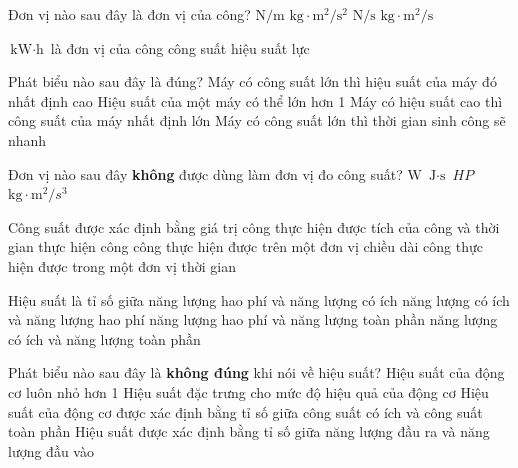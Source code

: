\begin{ex}
	Đơn vị nào sau đây là đơn vị của công?
	\choice
	{$\si{\newton/\meter}$}
	{\True $\si{\kilogram\cdot \meter^2/\second^2}$}
	{$\si{\newton/\second}$}
	{$\si{\kilogram\cdot\meter^2/\second}$}
	\loigiai{}
\end{ex}
\begin{ex}
	$\si{\kilo\watt\cdot\hour}$ là đơn vị của
	\choice
	{\True công}
	{công suất}
	{hiệu suất}
	{lực}
	\loigiai{}
\end{ex}
\begin{ex}
	Phát biểu nào sau đây là đúng?
	\choice
	{Máy có công suất lớn thì hiệu suất của máy đó nhất định cao}
	{Hiệu suất của một máy có thể lớn hơn 1}
	{Máy có hiệu suất cao thì công suất của máy nhất định lớn}
	{\True Máy có công suất lớn thì thời gian sinh công sẽ nhanh}
\end{ex}
\begin{ex}
	Đơn vị nào sau đây \textbf{không} được dùng làm đơn vị đo công suất?
	\choice
	{$\si{\watt}$}
	{\True $\si{\joule\cdot\second}$}
	{$\si{HP}$}
	{$\si{\kilogram\cdot\meter^2/s^3}$}
	\loigiai{}
\end{ex}
\begin{ex}
	Công suất được xác định bằng
	\choice
	{giá trị công thực hiện được}
	{tích của công và thời gian thực hiện công}
	{công thực hiện được trên một đơn vị chiều dài}
	{\True công thực hiện được trong một đơn vị thời gian}
	\loigiai{}
\end{ex}
\begin{ex}
	Hiệu suất là tỉ số giữa
	\choice
	{năng lượng hao phí và năng lượng có ích}
	{năng lượng có ích và năng lượng hao phí}
	{năng lượng hao phí và năng lượng toàn phần}
	{\True năng lượng có ích và năng lượng toàn phần}
	\loigiai{}
\end{ex}
\begin{ex}
	Phát biểu nào sau đây là \textbf{không đúng} khi nói về hiệu suất?	
	\choice
	{Hiệu suất của động cơ luôn nhỏ hơn 1}
	{Hiệu suất đặc trưng cho mức độ hiệu quả của động cơ}
	{Hiệu suất của động cơ được xác định bằng tỉ số giữa công suất có ích và công suất toàn phần}
	{\True Hiệu suất được xác định bằng tỉ số giữa năng lượng đầu ra và năng lượng đầu vào}
\end{ex}
